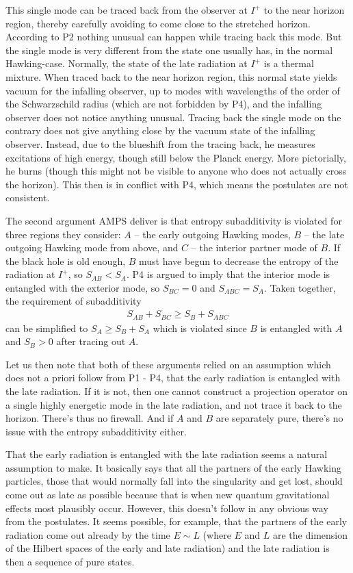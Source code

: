 \documentclass[12pt]{article}
\def\beqn{\begin{eqnarray}}
\def\eeqn{\end{eqnarray}}
\begin{document}
This single mode can be traced back from the observer at $I^+$ to the near horizon
region, thereby carefully avoiding to come close to the stretched horizon. According to P2
nothing unusual can happen while tracing back this mode. But the single mode
is very different from the state one usually has, in the normal Hawking-case. Normally,
the state of the late radiation at $I^+$ is a thermal mixture. When traced back to the near 
horizon region, this normal state yields vacuum for the infalling observer, up to modes with 
wavelengths of the order of the Schwarzschild radius (which are not forbidden by P4), and the
infalling observer does not notice anything unusual. Tracing back the
single mode on the contrary does not give anything close by the vacuum state of the
infalling observer. Instead, due to the blueshift from the tracing back, he measures 
excitations of high energy, though still below the Planck energy. More pictorially, he burns (though
this might not be visible to anyone who does not actually cross the horizon). This then 
is in conflict with P4, which means the postulates are not consistent.

The second argument {\sc AMPS} deliver is that entropy subadditivity is violated
for three regions they consider: $A$ -- the early outgoing Hawking modes, $B$  -- the late 
outgoing Hawking mode from above, and $C$ -- the interior partner mode of $B$. If the
black hole is old enough, $B$ must have begun to decrease the entropy of the
radiation at $I^+$, so $S_{AB} < S_{A}$. P4 is argued to imply that the interior
mode is entangled with the exterior mode, so $S_{BC} = 0$ and $S_{ABC} = S_A$.
Taken together, the requirement of subadditivity
\beqn
S_{AB} + S_{BC} \geq S_B + S_{ABC} 
\eeqn
can be simplified to $S_A \geq S_B + S_A$ which is violated since $B$ is entangled
with $A$ and $S_B > 0$ after tracing out $A$. 

Let us then note that both of these arguments relied on an assumption which
does not a priori follow from P1 - P4, that the early radiation is
entangled with the late radiation. If it is not, then one cannot construct 
a projection operator on a single highly energetic mode in the late radiation,
and not trace it back to the horizon. There's thus no firewall. And if $A$ and
$B$ are separately pure, there's no issue with the entropy subadditivity either.

That the early radiation is entangled with the late radiation seems
a natural assumption to make. It basically says that all the partners of the
early Hawking particles, those that would normally fall into the singularity
and get lost, should come out as late as possible because that is when
new quantum gravitational effects most plausibly occur. However, this
doesn't follow in any obvious way from the postulates. It seems possible,
for example, that the partners of the early radiation come out already
by the time $E \sim L$ (where $E$ and $L$ are the dimension of the
Hilbert spaces of the early and late radiation) and the late radiation is 
then a sequence of pure states. 
\end{document}

